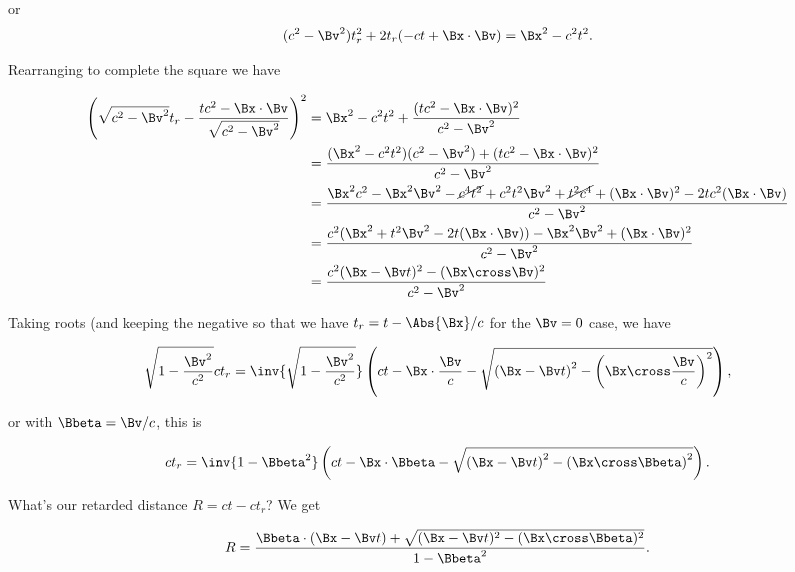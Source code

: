 or
\begin{equation}\label{eqn:relElectroDynProblemSet5:650}
( c^2 -\Bv^2) t_r^2 + 2 t_r ( - c t + \Bx \cdot \Bv ) = \Bx^2 - c^2 t^2.
\end{equation}

Rearranging to complete the square we have

\begin{align*}
\left( \sqrt{c^2 - \Bv^2} t_r - \frac{ t c^2 - \Bx \cdot \Bv }{\sqrt{c^2 - \Bv^2}} \right)^2 
&= \Bx^2 - c^2 t^2 +\frac{ (t c^2 - \Bx \cdot \Bv)^2 }{c^2 - \Bv^2} \\
&= \frac{ (\Bx^2 - c^2 t^2)( c^2 - \Bv^2) + (t c^2 - \Bx \cdot \Bv)^2}{ c^2 - \Bv^2} \\
&= \frac{ \Bx^2 c^2 - \Bx^2 \Bv^2 - \cancel{c^4 t^2} + c^2 t^2 \Bv^2 + \cancel{t^2 c^4} + (\Bx \cdot \Bv)^2 - 2 t c^2 (\Bx \cdot \Bv) }{ c^2 - \Bv^2 } \\
&= \frac{ c^2 ( \Bx^2 + t^2 \Bv^2 -2 t (\Bx \cdot \Bv)) - \Bx^2 \Bv^2 + (\Bx \cdot \Bv)^2 }{ c^2 - \Bv^2 } \\
&= \frac{ c^2 ( \Bx - \Bv t)^2 - (\Bx \cross \Bv)^2 }{ c^2 - \Bv^2 } \\
\end{align*}

Taking roots (and keeping the negative so that we have $t_r = t - \Abs{\Bx}/c$ for the $\Bv = 0$ case, we have

\begin{equation}\label{eqn:relElectroDynProblemSet5:670}
\sqrt{1 - \frac{\Bv^2}{c^2}} c t_r 
=
\inv{\sqrt{1 - \frac{\Bv^2}{c^2}}} \left(
c t - \Bx \cdot \frac{\Bv}{c} - \sqrt{ \left( \Bx - \Bv t \right)^2 - \left(\Bx \cross \frac{\Bv}{c}\right)^2 }
\right),
\end{equation}

or with $\Bbeta = \Bv/c$, this is

\begin{equation}\label{eqn:relElectroDynProblemSet5:690}
c t_r = \inv{1 - \Bbeta^2} \left( c t - \Bx \cdot \Bbeta - \sqrt{ \left( \Bx - \Bv t \right)^2 - \left(\Bx \cross \Bbeta\right)^2 } \right).
\end{equation}

What's our retarded distance $R = c t - c t_r$?  We get

\begin{equation}\label{eqn:relElectroDynProblemSet5:710}
R = \frac{\Bbeta \cdot (\Bx - \Bv t) + \sqrt{ (\Bx - \Bv t)^2 - (\Bx \cross \Bbeta)^2 }}{ 1 - \Bbeta^2 }.
\end{equation}

